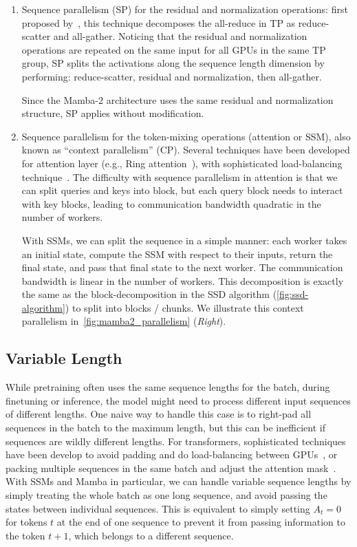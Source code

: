 \begin{enumerate}
\item Sequence parallelism (SP) for the residual and normalization operations: first proposed by~\citep{korthikanti2023reducing}, this technique decomposes the all-reduce in TP as reduce-scatter and all-gather. Noticing that the residual and normalization operations are repeated on the same input for all GPUs in the same TP group, SP splits the activations along the sequence length dimension by performing: reduce-scatter, residual and normalization, then all-gather.

Since the Mamba-2 architecture uses the same residual and normalization structure, SP applies without modification.

\item Sequence parallelism for the token-mixing operations (attention or SSM), also known as ``context parallelism'' (CP). Several techniques have been developed for attention layer (e.g., Ring attention~\citep{liu2023ring, liu2024world}), with sophisticated load-balancing technique~\citep{brandon2023striped}.
The difficulty with sequence parallelism in attention is that we can split queries and keys into block, but each query block needs to interact with key blocks, leading to communication bandwidth quadratic in the number of workers.

With SSMs, we can split the sequence in a simple manner: each worker takes an initial state, compute the SSM with respect to their inputs, return the final state, and pass that final state to the next worker. The communication bandwidth is linear in the number of workers. This decomposition is exactly the same as the block-decomposition in the SSD algorithm (\ref{fig:ssd-algorithm}) to split into blocks / chunks. We illustrate this context parallelism in~\ref{fig:mamba2_parallelism} (\emph{Right}).

\end{enumerate}

\subsection{Variable Length}
\label{subsec:varlen}

While pretraining often uses the same sequence lengths for the batch, during finetuning or inference, the model might need to process different input sequences of different lengths. One naive way to handle this case is to right-pad all sequences in the batch to the maximum length, but this can be inefficient if sequences are wildly different lengths. For transformers, sophisticated techniques have been develop to avoid padding and do load-balancing between GPUs~\citep{zeng2022boosting, zhai2023bytetransformer}, or packing multiple sequences in the same batch and adjust the attention mask~\citep{ding2024fewer, pouransari2024dataset}. With SSMs and Mamba in particular, we can handle variable sequence lengths by simply treating the whole batch as one long sequence, and avoid passing the states between individual sequences. This is equivalent to simply setting $A_t = 0$ for tokens $t$ at the end of one sequence to prevent it from passing information to the token $t + 1$, which belongs to a different sequence.

